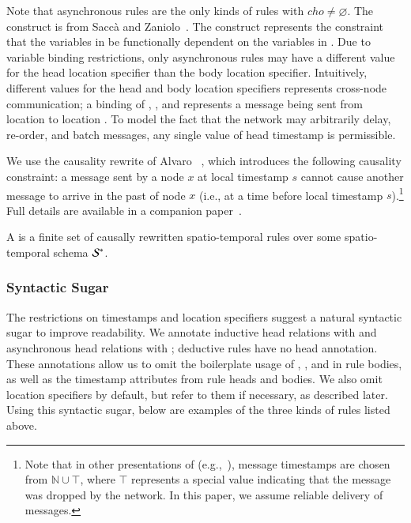 Note that asynchronous rules are the only kinds of rules with $cho \neq \varnothing$.
The  construct is from Sacc\`{a} and Zaniolo~\cite{sacca-zaniolo}.
The  construct represents the constraint that the variables in  be functionally dependent on the variables in .
Due to variable binding restrictions, only asynchronous rules may
have a different value for the head location specifier than the body location
specifier.  Intuitively, different values for the head and body location specifiers represents
cross-node communication; a binding of , , and 
represents a message
being sent from location  to location .  To model the fact
that the network may arbitrarily delay, re-order, and batch messages, any single
value of head timestamp  is permissible.

We use the causality rewrite of Alvaro \etal~\cite{ameloot-operational}, which introduces the following causality constraint: a message sent by a node $x$ at local timestamp $s$ cannot cause another message to arrive in the past of node $x$ (i.e., at a time before local timestamp $s$).\footnote{Note that in
  other presentations of \lang (e.g.,~\cite{dedalus}), message timestamps are
  chosen from $\mathbb{N} \cup \top$, where $\top$ represents a special value
  indicating that the message was dropped by the network. In this paper, we
  assume reliable delivery of messages.}  Full details are available in a companion paper~\cite{ameloot-operational}.

A  is a finite set of causally rewritten spatio-temporal rules over some spatio-temporal schema $\stschema$.  

\subsubsection{Syntactic Sugar}
The restrictions on timestamps and location specifiers suggest a natural
syntactic sugar to improve readability.  We annotate inductive head relations
with  and asynchronous head relations with ;
deductive rules have no head annotation.  These annotations allow us to omit the
boilerplate usage of , ,  and
 in rule bodies, as well as the timestamp attributes from rule
heads and bodies.  We also omit location specifiers by default, but refer to them if necessary, as described later.  Using this syntactic sugar, below are examples of the three kinds of rules listed above.

